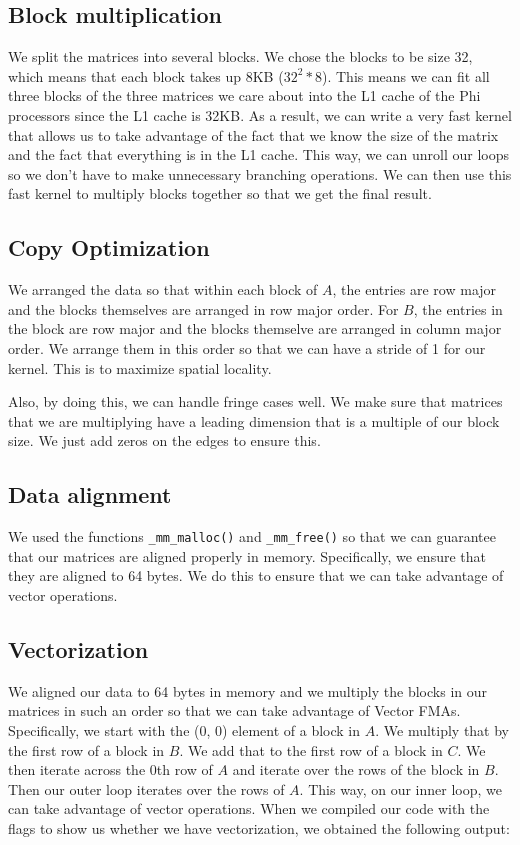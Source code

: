\documentclass[11pt]{article}
\begin{document}
        \subsection*{Block multiplication}
            We split the matrices into several blocks. We chose the blocks to be size 32, which means that each block takes up 8KB ($32^2 * 8$). This means we can fit all three blocks of the three matrices we care about into the L1 cache of the Phi processors since the L1 cache is 32KB. As a result, we can write a very fast kernel that allows us to take advantage of the fact that we know the size of the matrix and the fact that everything is in the L1 cache. This way, we can unroll our loops so we don't have to make unnecessary branching operations. We can then use this fast kernel to multiply blocks together so that we get the final result.


        \subsection*{Copy Optimization}
            We arranged the data so that within each block of $A$, the entries are row major and the blocks themselves are arranged in row major order. For $B$, the entries in the block are row major and the blocks themselve are arranged in column major order. We arrange them in this order so that we can have a stride of 1 for our kernel. This is to maximize spatial locality.

            Also, by doing this, we can handle fringe cases well. We make sure that matrices that we are multiplying have a leading dimension that is a multiple of our block size. We just add zeros on the edges to ensure this.

        \subsection*{Data alignment}
            We used the functions \texttt{\_mm\_malloc()} and \texttt{\_mm\_free()} so that we can guarantee that our matrices are aligned properly in memory. Specifically, we ensure that they are aligned to 64 bytes. We do this to ensure that we can take advantage of vector operations.

        \subsection*{Vectorization}
            We aligned our data to 64 bytes in memory and we multiply the blocks in our matrices in such an order so that we can take advantage of Vector FMAs. Specifically, we start with the (0, 0) element of a block in $A$. We multiply that by the first row of a block in $B$. We add that to the first row of a block in $C$. We then iterate across the 0th row of $A$ and iterate over the rows of the block in $B$. Then our outer loop iterates over the rows of $A$. This way, on our inner loop, we can take advantage of vector operations. When we compiled our code with the flags to show us whether we have vectorization, we obtained the following output:
\end{document}
